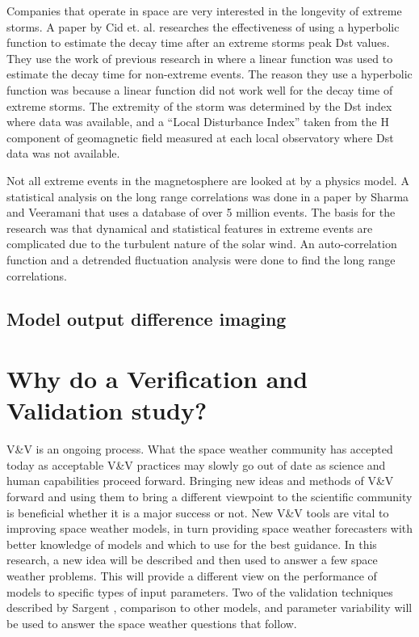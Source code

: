 Companies that operate in space are very interested in the longevity of extreme
storms. A paper by Cid et. al. \cite{Cid2013} researches the effectiveness of
using a hyperbolic function to estimate the decay time after an extreme storms
peak Dst values. They use the work of previous research in where a linear function was
used to estimate the decay time for non-extreme events. The reason they use a
hyperbolic function was because a linear function did not work well for the
decay time of extreme storms. The extremity of the storm was determined by the
Dst index where data was available, and a ``Local Disturbance Index'' taken from
the H component of geomagnetic field measured at each local observatory where
Dst data was not available.

Not all extreme events in the magnetosphere are looked at by a physics model.
A statistical analysis on the long range correlations was done in a paper by
Sharma and Veeramani \cite{Sharma2011} that uses a database of over 5 million
events. The basis for the research was that dynamical and statistical features
in extreme events are complicated due to the turbulent nature of the solar wind.
An auto-correlation function and a detrended fluctuation analysis were done to
find the long range correlations.
\subsection{Model output difference imaging}

\section{Why do a Verification and Validation study?}
V\&V is an ongoing process. What the space weather community has accepted today
as acceptable V\&V practices may slowly go out of date as science and human
capabilities proceed forward. Bringing new ideas and methods of V\&V forward and
using them to bring a different viewpoint to the scientific community is beneficial
whether it is a major success or not. New V\&V tools are vital to improving
space weather models, in turn providing space weather forecasters with better
knowledge of models and which to use for the best guidance. In this
research, a new idea will be described and then used to answer a few space
weather problems. This will provide a different view on the performance of
models to specific types of input parameters. Two of the validation
techniques described by Sargent \cite{Sargent2004}, comparison to other models,
and parameter variability will be used to answer the space weather questions
that follow.
